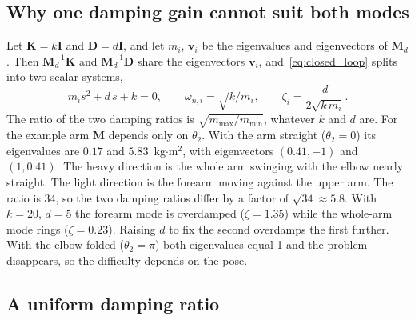 \documentclass[letterpaper, 10pt, conference]{ieeeconf}
\begin{document}
\subsection{Why one damping gain cannot suit both modes}

Let $\mathbf{K}=k\mathbf{I}$ and $\mathbf{D}=d\mathbf{I}$, and let
$m_i$, $\mathbf{v}_i$ be the eigenvalues and eigenvectors of
$\mathbf{M}_d$. Then $\mathbf{M}_d^{-1}\mathbf{K}$ and
$\mathbf{M}_d^{-1}\mathbf{D}$ share the eigenvectors $\mathbf{v}_i$,
and~\eqref{eq:closed_loop} splits into two scalar systems,
\begin{equation}
m_i s^2+d\,s+k=0,\qquad
\omega_{n,i}=\sqrt{k/m_i},\qquad
\zeta_i=\frac{d}{2\sqrt{k\,m_i}} .
\label{eq:modal}
\end{equation}
The ratio of the two damping ratios is
$\sqrt{m_{\max}/m_{\min}}$, whatever $k$ and $d$ are. For the
example arm $\mathbf{M}$ depends only on $\theta_2$. With the arm
straight ($\theta_2=0$) its eigenvalues are $0.17$ and
$5.83$~kg$\cdot$m$^2$, with eigenvectors $(0.41,-1)$ and
$(1,0.41)$. The heavy direction is the whole arm swinging with
the elbow nearly straight. The light direction is the forearm
moving against the upper arm. The ratio is 34, so the two
damping ratios differ by a factor of $\sqrt{34}\approx5.8$. With
$k=20$, $d=5$ the forearm mode is overdamped ($\zeta=1.35$) while
the whole-arm mode rings ($\zeta=0.23$). Raising $d$ to fix the
second overdamps the first further. With the elbow folded
($\theta_2=\pi$) both eigenvalues equal 1 and the problem
disappears, so the difficulty depends on the pose.

\subsection{A uniform damping ratio}
\end{document}
